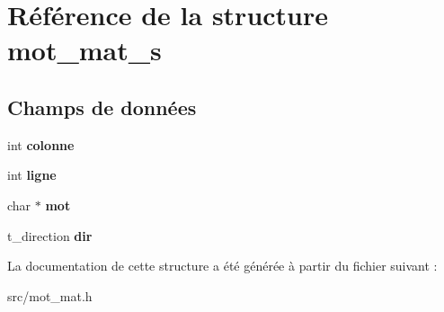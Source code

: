 \hypertarget{structmot__mat__s}{}\section{Référence de la structure mot\+\_\+mat\+\_\+s}
\label{structmot__mat__s}
\subsection*{Champs de données}
\begin{DoxyCompactItemize}
\item 
int {\bfseries colonne}\hypertarget{structmot__mat__s_a8d5fb219fa27d58faca17483f538a692}{}\label{structmot__mat__s_a8d5fb219fa27d58faca17483f538a692}

\item 
int {\bfseries ligne}\hypertarget{structmot__mat__s_ab6356d5fb49bcb2478ffab363e947e68}{}\label{structmot__mat__s_ab6356d5fb49bcb2478ffab363e947e68}

\item 
char $\ast$ {\bfseries mot}\hypertarget{structmot__mat__s_ae9144799389a5d8ba95e70dff6650adf}{}\label{structmot__mat__s_ae9144799389a5d8ba95e70dff6650adf}

\item 
t\+\_\+direction {\bfseries dir}\hypertarget{structmot__mat__s_a664c4d4a804890f1cbdff8a3923e1569}{}\label{structmot__mat__s_a664c4d4a804890f1cbdff8a3923e1569}

\end{DoxyCompactItemize}


La documentation de cette structure a été générée à partir du fichier suivant \+:\begin{DoxyCompactItemize}
\item 
src/mot\+\_\+mat.\+h\end{DoxyCompactItemize}
